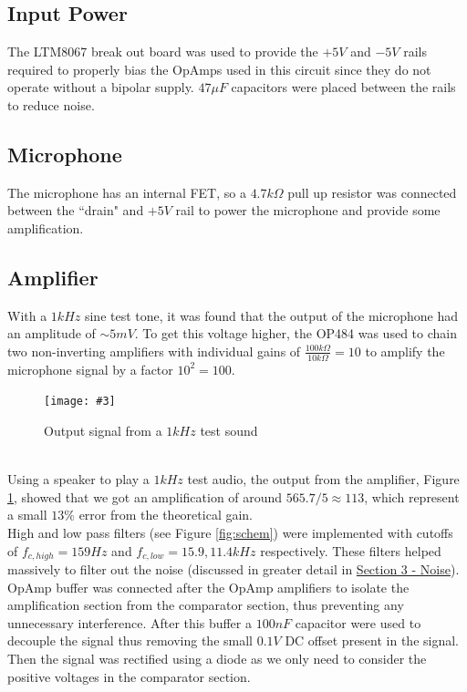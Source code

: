 \documentclass[10pt]{article}
\newcommand{\img}[5]{

    \begin{figure}[h]
        \begin{center}
        \texttt{[image: \#3]} 
         \caption{#4}
        \label{fig:#5}      
        \end{center}
    
    \end{figure}

}
\begin{document}
    \subsection{Input Power}
    The LTM8067 break out board was used to provide the $+5V$ and $-5V$ rails required to properly bias the OpAmps used in this circuit since they do not operate without a bipolar supply. $47\mu F$ capacitors were placed between the rails to reduce noise. 
    \subsection{Microphone}
    The microphone has an internal FET, so a $4.7k\Omega$ pull up resistor was connected between the ``drain" and $+5V$ rail to power the microphone and provide some amplification.
    \subsection{Amplifier}
    With a $1kHz$ sine test tone, it was found that the output of the microphone had an amplitude of $\sim5mV$. To get this voltage higher, the OP484 was used to chain two non-inverting amplifiers with individual gains of $\frac{100k\Omega}{10k\Omega}=10$ to  amplify the microphone signal by a factor $10^2=100$.
    
    \img{.9}{1}{filtered.png}{Output signal from a $1kHz$ test sound}{filtered}
    \noindent
    \vspace{-1.3em}
    \\Using a speaker to play a $1kHz$ test audio, the output from the amplifier, Figure \ref{fig:filtered}, showed that we got an amplification of around $565.7/5\approx 113$, which represent a small $13\%$ error from the theoretical gain.\\
    \noindent
    High and low pass filters (see Figure \ref{fig:schem}) were implemented with cutoffs of $f_{c,high}=159Hz$ and $f_{c,low}=15.9 , 11.4kHz$ respectively. These filters helped massively to filter out the noise (discussed in greater detail in \hyperref[sec:noise]{Section 3 - Noise}).
    \newline
     OpAmp buffer was connected after the OpAmp amplifiers to isolate the amplification section from the comparator section, thus preventing any unnecessary interference. After this buffer a $100nF$ capacitor were used to decouple the signal thus removing the small $0.1V$ DC offset present in the signal. Then the signal was rectified using a diode as we only need to consider the positive voltages in the comparator section.
    
\end{document}

